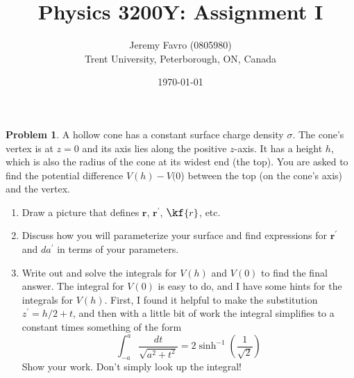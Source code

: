 \documentclass[10pt]{article}
\title{Physics 3200Y: Assignment I}
\author{Jeremy Favro (0805980) \\ Trent University, Peterborough, ON, Canada}
\date{\today}
\theoremstyle{definition}
\newtheorem{problem}{Problem}
\newcommand{\primed}[1]{{#1^\prime}}
\newcommand{\scriptr}{\fontsize{12pt}{12pt}\kf{r}}
\newcommand{\bv}[1]{\mathbf{#1}}
\begin{document}
\maketitle

\begin{problem}
A hollow cone has a constant surface charge density $\sigma$. The cone's vertex is at $z = 0$ and its axis lies along the
positive $z$-axis. It has a height $h$, which is also the radius of the cone at its widest end (the top). You are asked
to find the potential difference $V (h) - V (0$) between the top (on the cone's axis) and the vertex.
\begin{enumerate}[label=(\alph*)]
  \item Draw a picture that defines $\bv{r}$, $\primed{\bv{r}}$, $\scriptr$, etc.
  \item Discuss how you will parameterize your surface and find expressions for $\primed{\bv{r}}$ and $d\primed{a}$ in terms of your parameters.
  \item Write out and solve the integrals for $V (h)$ and $V (0)$ to find the final answer. The integral for $V (0)$ is easy
        to do, and I have some hints for the integrals for $V (h)$. First, I found it helpful to make the substitution
        $\primed{z}=h/2+t$, and then with a little bit of work the integral simplifies to a constant times something of the
        form
        $$\int_{-a}^{a}\frac{dt}{\sqrt{a^2+t^2}}=2\sinh^{-1}(\frac{1}{\sqrt{2}})$$
        Show your work. Don't simply look up the integral!
\end{enumerate}
\end{problem}
\end{document}

